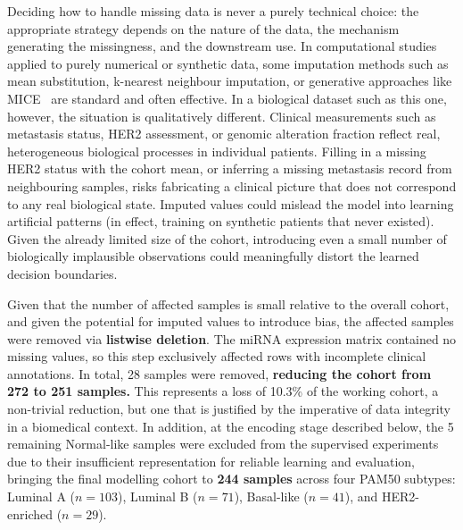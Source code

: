 Deciding how to handle missing data is never a purely technical choice: the
appropriate strategy depends on the nature of the data, the mechanism
generating the missingness, and the downstream use. In computational studies
applied to purely numerical or synthetic data, some imputation methods such as
mean substitution, k-nearest neighbour imputation, or generative approaches
like MICE~\cite{buuren2011mice} are standard and often effective. In a
biological dataset such as this one, however, the situation is qualitatively
different. Clinical measurements such as metastasis status, HER2 assessment,
or genomic alteration fraction reflect real, heterogeneous biological processes
in individual patients. Filling in a missing HER2 status with the cohort mean,
or inferring a missing metastasis record from neighbouring samples, risks
fabricating a clinical picture that does not correspond to any real biological
state. Imputed values could mislead the model into learning artificial patterns
(in effect, training on synthetic patients that never existed). Given the
already limited size of the cohort, introducing even a small number of
biologically implausible observations could meaningfully distort the learned
decision boundaries.

Given that the number of affected samples is small relative to the overall cohort, 
and given the potential for imputed values to introduce bias, the affected samples 
were removed via \textbf{listwise deletion}. The miRNA expression matrix contained no missing values, so this
step exclusively affected rows with incomplete clinical annotations. In total,
28 samples were removed, \textbf{reducing the cohort from 272 to 251 samples.} This
represents a loss of 10.3\% of the working cohort, a non-trivial reduction,
but one that is justified by the imperative of data integrity in a biomedical
context. In addition, at the encoding stage described below, the 5 remaining
Normal-like samples were excluded from the supervised experiments due to their
insufficient representation for reliable learning and evaluation, bringing the
final modelling cohort to \textbf{244 samples} across four PAM50 subtypes:
Luminal A ($n = 103$), Luminal B ($n = 71$), Basal-like ($n = 41$), and
HER2-enriched ($n = 29$).
 

